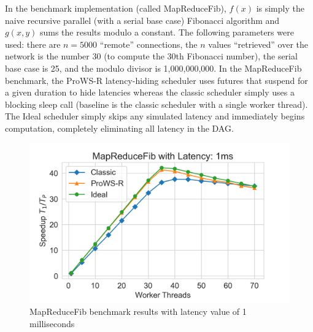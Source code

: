 \documentclass[bsc,frontabs,singlespacing,parskip,deptreport,normalheadings]{infthesis}
\begin{document}
In the benchmark implementation (called MapReduceFib), \(f(x)\) is simply the
naive recursive parallel (with a serial base case) Fibonacci algorithm and
\(g(x,y)\) sums the results modulo a constant. The following parameters were
used: there are \(n = 5000\) ``remote'' connections, the \(n\) values
``retrieved'' over the network is the number 30 (to compute the 30th Fibonacci
number), the serial base case is 25, and the modulo divisor is 1,000,000,000. In
the MapReduceFib benchmark, the ProWS-R latency-hiding scheduler uses futures
that suspend for a given duration to hide latencies whereas the classic
scheduler simply uses a blocking sleep call (baseline is the classic scheduler
with a single worker thread). The Ideal scheduler simply skips any simulated
latency and immediately begins computation, completely eliminating all latency
in the DAG.

\begin{figure}[ht]
    \centering
    \includegraphics[width=0.8\linewidth]{figures/map_reduce_plot_latency_1.png}
    \caption{MapReduceFib benchmark results with latency value of 1 milliseconds}
    \label{fig:map_reduce_plots_1ms}
\end{figure}
\end{document}
